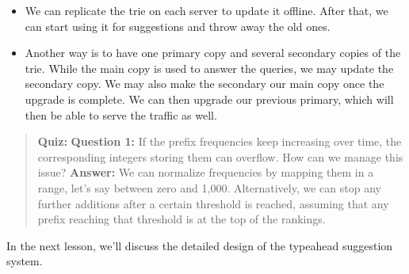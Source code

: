 \begin{itemize}
\item
\protect{}\label{3f7NtkTj63r7OLAR9rT4I}
We can replicate the trie on each server to update it offline. After that, we can start using it for suggestions and throw away the old ones.
\item
\protect{}\label{plWGUn4vbiyUo312Ud7tx}
Another way is to have one primary copy and several secondary copies of the trie. While the main copy is used to answer the queries, we may update the secondary copy. We may also make the secondary our main copy once the upgrade is complete. We can then upgrade our previous primary, which will then be able to serve the traffic as well.
\end{itemize}

\begin{quote}
\textbf{Quiz:}
\textbf{Question 1:} If the prefix frequencies keep increasing over time, the corresponding integers storing them can overflow. How can we manage this issue?
\textbf{Answer:} We can normalize frequencies by mapping them in a range, let's say between zero and 1,000. Alternatively, we can stop any further additions after a certain threshold is reached, assuming that any prefix reaching that threshold is at the top of the rankings.
\end{quote}

In the next lesson, we'll discuss the detailed design of the typeahead suggestion system.

